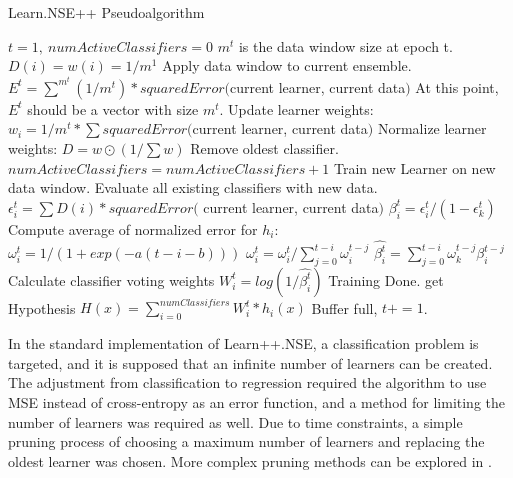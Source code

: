 		\begin{algorithm}[ht]
		\caption{Learn.NSE++ Pseudoalgorithm}
		\label{code:bg_nse}
		\begin{algorithmic}[1]
			\State $t=1,\ numActiveClassifiers = 0$ 
			\State $m^t$ is the data window size at epoch t.
			\State $D(i) = w(i) = 1/m^1$
			\EndFor
			\Else
			\State Apply data window to current ensemble. 
			\State $E^t = \sum^{m^t}(1/m^t) * squaredError($current learner, current data$)$
			\State At this point, $E^t$ should be a vector with size $m^t$.
			\State Update learner weights: $w_i = 1/m^t * \sum squaredError($current learner, current data$)$
			\EndFor
			\State Normalize learner weights: $D = w \odot (1/\sum w)$
			\EndIf
			\State Remove oldest classifier.
			\Else
			 $numActiveClassifiers = numActiveClassifiers + 1$
			\EndIf
			\State Train new Learner on new data window.
			\State Evaluate all existing classifiers with new data.
			\State $\epsilon_i^t = \sum D(i) * squaredError($ current learner, current data$)$
			\State $\beta_i^t = \epsilon_i^t/(1-\epsilon_k^t) $
			\State Compute average of normalized error for $h_i$: $\omega_i^t = 1/(1+exp(-a(t-i-b)))$
			\State $\omega_i^t = \omega_i^t / \sum_{j=0}^{t-i} \omega_i^{t-j}$
			\State $\hat{\beta_i^t} = \sum_{j=0}^{t-i} \omega_k^{t-j} \beta_i^{t-j}$
			\State Calculate classifier voting weights $W_i^t = log(1/\hat{\beta_i^t})$
			\EndIf
			\EndFor
			\State Training Done.
			\State get Hypothesis $H(x) =\sum_{i=0}^{numClassifiers} W_i^t * h_i(x) $
			\EndWhile
			\State Buffer full, $t += 1$.
			\EndWhile
			\EndProcedure
		\end{algorithmic}
	\end{algorithm}
	\par In the standard implementation of Learn++.NSE, a classification problem is targeted, and it is supposed that an infinite number of learners can be created. The adjustment from classification to regression required the algorithm to use MSE instead of cross-entropy as an error function, and a method for limiting the number of learners was required as well. Due to time constraints, a simple pruning process of choosing a maximum number of learners and replacing the oldest learner was chosen. More complex pruning methods can be explored in \cite{placeholderCitation}.
